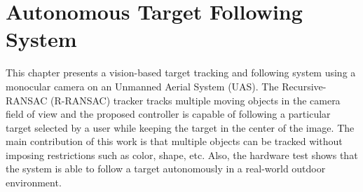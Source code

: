\chapter{Autonomous Target Following System}
This chapter presents a vision-based target tracking and following system using a monocular camera on an Unmanned Aerial System (UAS). The Recursive-RANSAC (R-RANSAC) tracker tracks multiple moving objects in the camera field of view and the proposed controller is capable of following a particular target selected by a user while keeping the target in the center of the image. The main contribution of this work is that multiple objects can be tracked without imposing restrictions such as color, shape, etc. Also, the hardware test shows that the system is able to follow a target autonomously in a real-world outdoor environment.

